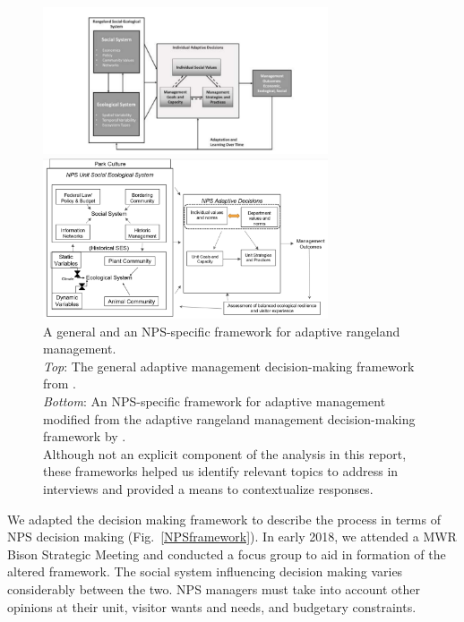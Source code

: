 \begin{figure}[t]
	\begin{minipage}{0.3\textwidth}
		\raggedright
		\caption[Adaptive management frameworks]
		{A general and an NPS-specific framework for adaptive rangeland management. \\
		\emph{Top}: The general adaptive management decision-making framework from \citet{lubell2013}. \\
		\emph{Bottom}: An NPS-specific framework for adaptive management modified from the adaptive rangeland management decision-making framework by \citet{lubell2013}. \\
		Although not an explicit component of the analysis in this report, these frameworks helped us identify relevant topics to address in interviews and provided a means to contextualize responses. } \label{LubellFramework}
	\end{minipage}
\begin{minipage}{0.8\textwidth}
	\centering
	\includegraphics[width=0.75\textwidth]
		{figures/LubellFramework.pdf}

	\includegraphics[width=0.75\textwidth]
		{figures/nps.png}
			\end{minipage}
\end{figure}


We adapted the decision making framework to describe the process in terms of NPS decision making (Fig.~\ref{NPSframework}).
In early 2018, we attended a MWR Bison Strategic Meeting and conducted a focus group to aid in formation of the altered framework. 
The social system influencing decision making varies considerably between the two. 
NPS managers must take into account other opinions at their unit, visitor wants and needs, and budgetary constraints.

